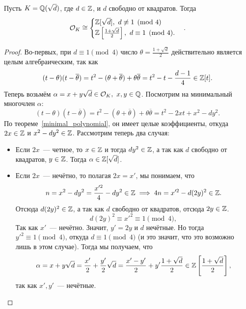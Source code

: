 	\begin{theorem} 
		Пусть $K = \mathbb{Q}(\sqrt{d})$, где $d \in \mathbb{Z}$, и $d$ свободно от квадратов. Тогда  
		\[
		  		\mathcal{O}_{K} \cong \begin{cases} \mathbb{Z}[\sqrt{d}], \ d \not\equiv 1 \pmod{4} \\ \mathbb{Z}\left[ \frac{1 + \sqrt{d}}{2} \right],\ d \equiv 1 \pmod{4}. \end{cases}.
		  	\]  	
	\end{theorem}
	\begin{proof}
		Во-первых, при $d \equiv 1 \pmod{4}$ число $\theta = \frac{1 + \sqrt{d}}{2} $ действительно является целым алгебраическим, так как 
		\[
			(t - \theta)(t - \overline{\theta}) = t^2 - (\theta + \overline{\theta}) + \theta \overline{\theta} = t^2 - t - \frac{d - 1}{4} \in \mathbb{Z}[t]. 
		\]
		Теперь возьмём $\alpha = x + y\sqrt{d} \in \mathcal{O}_{K}, \ x, y \in \mathbb{Q}$. Посмотрим на минимальный многочлен $\alpha$: 
		\[
			(t - \theta)(t - \overline{\theta}) = t^2 - (\theta + \overline{\theta}) + \theta \overline{\theta} = t^2 - 2xt + x^2 - dy^2.
		\]
		По теореме~\ref{minimal_polynomial}, он имеет целые коэффициенты, откуда $2x \in \mathbb{Z}$ и $x^2 - dy^2 \in \mathbb{Z}$. Рассмотрим теперь два случая: 

		\begin{itemize}
			\item Если $2x$~--- четное, то $x \in \mathbb{Z}$ и тогда $dy^2 \in \mathbb{Z}$, а так как $d$ свободно от квадратов, $y \in \mathbb{Z}$. Тогда $\alpha \in \mathbb{Z}[\sqrt{d}]$. 

			\item Если $2x$~--- нечётно, то полагая $2x = x'$, мы понимаем, что 
			\[
				n = x^2 - dy^2 = \frac{x'^2}{4} - dy^2 \in \mathbb{Z} \implies 4n = x'^2 - d(2y)^2 \in \mathbb{Z}.	
			\]
			Отсюда $d(2y)^2 \in \mathbb{Z}$, а так как $d$ свободно от квадратов, отсюда $2y \in \mathbb{Z}$. 
			\[
				d(2y)^2 \equiv x'^2 \equiv 1 \pmod{4}, 
			\]
			Так как $x'$~--- нечётно. Значит, $y' = 2y$ и $d$ нечётные. Но тогда $y'^2 \equiv 1 \pmod{4}$, откуда $d \equiv 1 \pmod{4}$ (и это значит, что это возможно лишь в этом случае). Тогда мы получаем, что 
			\[
			 	\alpha = x + y\sqrt{d} = \frac{x'}{2} + \frac{y'}{2}\sqrt{d} = \frac{x' - y'}{2} + y' \frac{1 + \sqrt{d}}{2} \in \mathbb{Z}\left[ \frac{1 + \sqrt{d}}{2} \right],
			 \] 
			 так как $x', y'$~--- нечётные. 
		\end{itemize}
	\end{proof}
